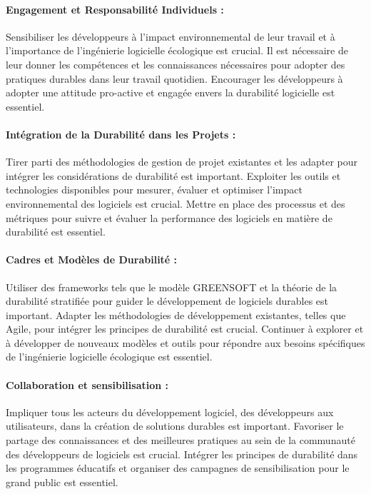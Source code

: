\paragraph{Engagement et Responsabilité Individuels :} Sensibiliser les développeurs à l'impact environnemental de leur travail et à l'importance de l'ingénierie logicielle écologique est crucial. Il est nécessaire de leur donner les compétences et les connaissances nécessaires pour adopter des pratiques durables dans leur travail quotidien. Encourager les développeurs à adopter une attitude pro-active et engagée envers la durabilité logicielle est essentiel.

\paragraph{Intégration de la Durabilité dans les Projets :} Tirer parti des méthodologies de gestion de projet existantes et les adapter pour intégrer les considérations de durabilité est important. Exploiter les outils et technologies disponibles pour mesurer, évaluer et optimiser l'impact environnemental des logiciels est crucial. Mettre en place des processus et des métriques pour suivre et évaluer la performance des logiciels en matière de durabilité est essentiel.

\paragraph{Cadres et Modèles de Durabilité :} Utiliser des frameworks tels que le modèle GREENSOFT et la théorie de la durabilité stratifiée pour guider le développement de logiciels durables est important. Adapter les méthodologies de développement existantes, telles que Agile, pour intégrer les principes de durabilité est crucial. Continuer à explorer et à développer de nouveaux modèles et outils pour répondre aux besoins spécifiques de l'ingénierie logicielle écologique est essentiel.

\paragraph{Collaboration et sensibilisation :} Impliquer tous les acteurs du développement logiciel, des développeurs aux utilisateurs, dans la création de solutions durables est important. Favoriser le partage des connaissances et des meilleures pratiques au sein de la communauté des développeurs de logiciels est crucial. Intégrer les principes de durabilité dans les programmes éducatifs et organiser des campagnes de sensibilisation pour le grand public est essentiel.

